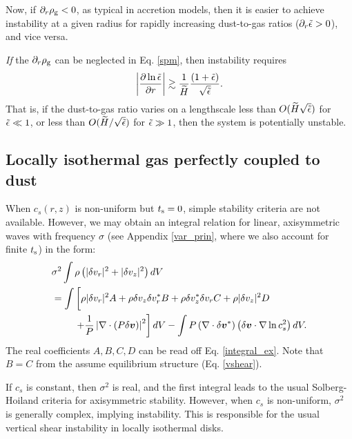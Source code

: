 Now, if $\partial_r\rho_\mathrm{g}<0$, as typical in
accretion models, then it is easier to achieve instability at a given
radius for rapidly increasing dust-to-gas ratios ($\partial_r\tilde{\epsilon} >
0$), and vice versa. 

\emph{If} the $\partial_r\rho_\mathrm{g}$ can be neglected in Eq. \ref{spm},
then instability requires
\begin{align}
  \left|\frac{\partial\ln{\tilde{\epsilon}}}{\partial r}\right| \gtrsim
  \frac{1}{\widetilde{H}}\frac{\left(1+\tilde{\epsilon}\right)}{\sqrt{\tilde{\epsilon}}}. 
\end{align}
That is, if the dust-to-gas ratio varies on a lengthscale less than
$O(\widetilde{H}\sqrt{\tilde{\epsilon}})$ for $\tilde{\epsilon}\ll 1$, or less than
$O(\widetilde{H}/\sqrt{\tilde{\epsilon}})$ for $\tilde{\epsilon}\gg 1$, then the system is
potentially unstable.   



\subsection{Locally isothermal gas perfectly coupled to dust} 
When $c_s(r,z)$ is non-uniform but $t_\mathrm{s}=0$, simple stability
criteria are not available. However, we may obtain an integral
relation for linear, axisymmetric waves with frequency $\sigma$ (see
Appendix \ref{var_prin}, where we also account for finite $t_\mathrm{s}$) in
the form:   
\begin{align}
&  \sigma^2\int\rho\left(|\dd v_r|^2 + |\dd v_z|^2\right)dV \notag\\
&= \int\left[ \rho
  |\dd v_r|^2A + \rho  \dd v_z \dd v_r^* B + \rho \dd v_z^*\dd v_r C +
  \rho |\dd v_z|^2 D\phantom{\frac{1}{1}}\right. \notag\\
&\phantom{===}  \left. + \frac{1}{P}\left|\nabla\cdot\left(P\dd
  \bm{v}\right)\right|^2\right]dV - \int P
  \left(\nabla\cdot\dd\bm{v}^*\right)\left(\dd\bm{v}\cdot\nabla\ln{c_s^2}\right)dV.
\end{align}
The real coefficients $A,B,C,D$ can be read off
Eq. \ref{integral_ex}. Note that $B=C$ from the assume equilibrium
structure (Eq. \ref{vshear}).  

If $c_s$ is constant, then $\sigma^2$ is real, and 
the first integral leads to the usual Solberg-Hoiland criteria for
axisymmetric stability. However, when $c_s$ is non-uniform, $\sigma^2$
is generally complex, implying instability. This is responsible for
the usual vertical shear instability in locally isothermal disks. 

